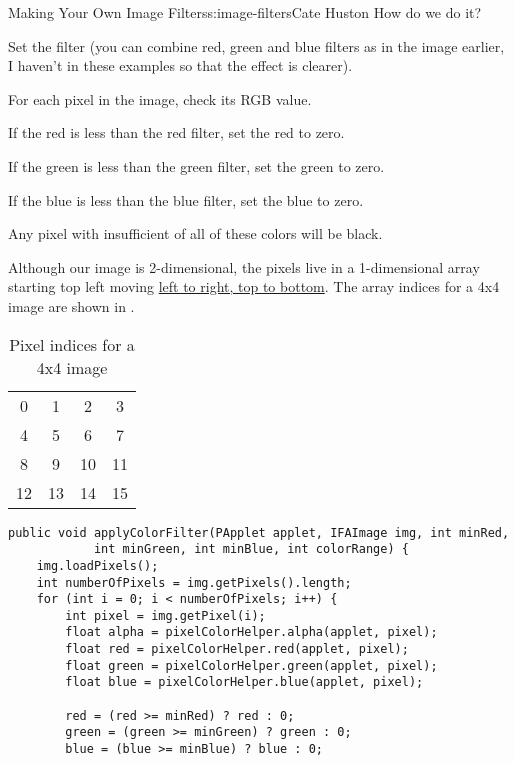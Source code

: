 \begin{aosachapter}{Making Your Own Image Filters}{s:image-filters}{Cate Huston}
How do we do it?

\begin{aosaitemize}
\item
  Set the filter (you can combine red, green and blue filters as in the
  image earlier, I haven't in these examples so that the effect is
  clearer).
\item
  For each pixel in the image, check its RGB value.
\item
  If the red is less than the red filter, set the red to zero.
\item
  If the green is less than the green filter, set the green to zero.
\item
  If the blue is less than the blue filter, set the blue to zero.
\item
  Any pixel with insufficient of all of these colors will be black.
\end{aosaitemize}

Although our image is 2-dimensional, the pixels live in a 1-dimensional
array starting top left moving
\href{https://processing.org/tutorials/pixels/}{left to right, top to
bottom}. The array indices for a 4x4 image are shown in .

\begin{table}
\centering
{\footnotesize
{}
\begin{tabular}{cccc}
\hline
0 & 1 & 2 & 3 \\
4 & 5 & 6 & 7 \\
8 & 9 & 10 & 11 \\
12 & 13 & 14 & 15 \\
\hline
\end{tabular}
}
\caption{Pixel indices for a 4x4 image}
\label{500l.imagefilters.pixelindices}
\end{table}

\begin{verbatim}
public void applyColorFilter(PApplet applet, IFAImage img, int minRed,
            int minGreen, int minBlue, int colorRange) {    
    img.loadPixels();
    int numberOfPixels = img.getPixels().length;
    for (int i = 0; i < numberOfPixels; i++) {
        int pixel = img.getPixel(i);
        float alpha = pixelColorHelper.alpha(applet, pixel);
        float red = pixelColorHelper.red(applet, pixel);
        float green = pixelColorHelper.green(applet, pixel);
        float blue = pixelColorHelper.blue(applet, pixel);
            
        red = (red >= minRed) ? red : 0;
        green = (green >= minGreen) ? green : 0;
        blue = (blue >= minBlue) ? blue : 0;
        

\end{verbatim}
\end{aosachapter}
